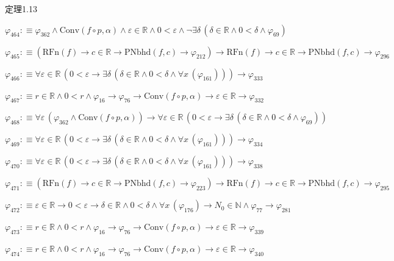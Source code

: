 \begin{fullproof}{定理1.13}
\begin{abbrevlist}
\item $\varphi_{464} :\equiv \varphi_{362} \land \mathrm{Conv}(f \circ p,\alpha) \land \varepsilon \in \mathbb{R} \land 0 < \varepsilon \land \neg \exists \delta\,(\delta \in \mathbb{R} \land 0 < \delta \land \varphi_{69})$
\item $\varphi_{465} :\equiv (\mathrm{RFn}(f) \to c \in \mathbb{R} \to \mathrm{PNbhd}(f,c) \to \varphi_{212}) \to \mathrm{RFn}(f) \to c \in \mathbb{R} \to \mathrm{PNbhd}(f,c) \to \varphi_{296}$
\item $\varphi_{466} :\equiv \forall \varepsilon \in \mathbb{R}\,(0 < \varepsilon \to \exists \delta\,(\delta \in \mathbb{R} \land 0 < \delta \land \forall x\,(\varphi_{161}))) \to \varphi_{333}$
\item $\varphi_{467} :\equiv r \in \mathbb{R} \land 0 < r \land \varphi_{16} \to \varphi_{76} \to \mathrm{Conv}(f \circ p,\alpha) \to \varepsilon \in \mathbb{R} \to \varphi_{332}$
\item $\varphi_{468} :\equiv \forall \varepsilon\,(\varphi_{362} \land \mathrm{Conv}(f \circ p,\alpha)) \to \forall \varepsilon \in \mathbb{R}\,(0 < \varepsilon \to \exists \delta\,(\delta \in \mathbb{R} \land 0 < \delta \land \varphi_{69}))$
\item $\varphi_{469} :\equiv \forall \varepsilon \in \mathbb{R}\,(0 < \varepsilon \to \exists \delta\,(\delta \in \mathbb{R} \land 0 < \delta \land \forall x\,(\varphi_{161}))) \to \varphi_{334}$
\item $\varphi_{470} :\equiv \forall \varepsilon \in \mathbb{R}\,(0 < \varepsilon \to \exists \delta\,(\delta \in \mathbb{R} \land 0 < \delta \land \forall x\,(\varphi_{161}))) \to \varphi_{338}$
\item $\varphi_{471} :\equiv (\mathrm{RFn}(f) \to c \in \mathbb{R} \to \mathrm{PNbhd}(f,c) \to \varphi_{223}) \to \mathrm{RFn}(f) \to c \in \mathbb{R} \to \mathrm{PNbhd}(f,c) \to \varphi_{295}$
\item $\varphi_{472} :\equiv \varepsilon \in \mathbb{R} \to 0 < \varepsilon \to \delta \in \mathbb{R} \land 0 < \delta \land \forall x\,(\varphi_{176}) \to N_{0} \in \mathbb{N} \land \varphi_{77} \to \varphi_{281}$
\item $\varphi_{473} :\equiv r \in \mathbb{R} \land 0 < r \land \varphi_{16} \to \varphi_{76} \to \mathrm{Conv}(f \circ p,\alpha) \to \varepsilon \in \mathbb{R} \to \varphi_{339}$
\item $\varphi_{474} :\equiv r \in \mathbb{R} \land 0 < r \land \varphi_{16} \to \varphi_{76} \to \mathrm{Conv}(f \circ p,\alpha) \to \varepsilon \in \mathbb{R} \to \varphi_{340}$

\end{abbrevlist}
\end{fullproof}
